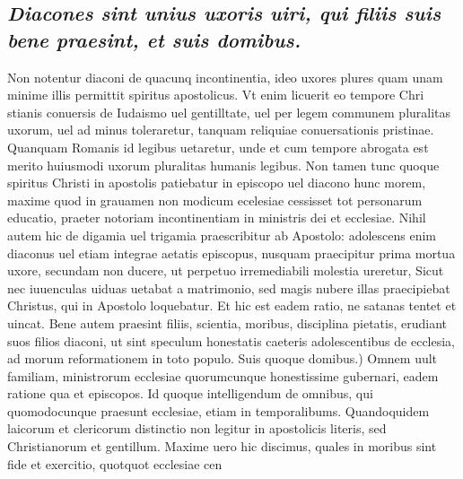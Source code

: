 \documentclass{article}
\begin{document}
\begin{pages}
\subsection*{\textit{Diacones sint unius uxoris uiri, qui filiis suis bene praesint, et suis domibus. }}\pstart Non notentur diaconi de quacunq incontinentia, ideo uxores plures quam unam minime illis permittit spiritus apostolicus. Vt enim licuerit eo tempore Chri stianis conuersis de Iudaismo uel gentilltate, uel per legem communem pluralitas uxorum, uel ad minus toleraretur, tanquam reliquiae conuersationis pristinae. Quanquam Romanis id legibus uetaretur, unde et cum tempore abrogata est merito huiusmodi uxorum pluralitas humanis legibus. Non tamen tunc quoque spiritus Christi in apostolis patiebatur in episcopo uel diacono hunc morem, maxime quod in grauamen non modicum ecelesiae cessisset tot personarum educatio, praeter notoriam incontinentiam in ministris dei et ecclesiae. Nihil autem hic de digamia uel trigamia praescribitur ab Apostolo: adolescens enim diaconus uel etiam integrae aetatis episcopus, nusquam praecipitur prima mortua uxore, secundam non ducere, ut perpetuo irremediabili molestia ureretur, Sicut nec iuuenculas uiduas uetabat a matrimonio, sed magis nubere illas praecipiebat Christus, qui in Apostolo loquebatur. Et hic est eadem ratio, ne satanas tentet et uincat. Bene autem praesint filiis, scientia, moribus, disciplina pietatis, erudiant suos filios diaconi, ut sint speculum honestatis caeteris adolescentibus de ecclesia, ad morum reformationem in toto populo. Suis quoque domibus.) Omnem uult familiam, ministrorum ecclesiae quorumcunque honestissime gubernari, eadem ratione qua et episcopos. Id quoque intelligendum de omnibus, qui quomodocunque praesunt ecclesiae, etiam in temporalibums. Quandoquidem laicorum et clericorum distinctio non legitur in apostolicis literis, sed Christianorum et gentillum. Maxime uero hic discimus, quales in moribus sint fide et exercitio, quotquot ecclesiae cen  \pend

\end{pages}
\end{document}
